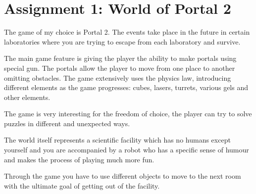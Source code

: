 \documentclass{article}
\begin{document}
\section*{Assignment 1: World of Portal 2}

The game of my choice is Portal 2. The events take place in the future in
certain laboratories where you are trying to escape from each laboratory and
survive.

The main game feature is giving the player the ability to make portals using
special gun. The portals allow the player to move from one place to another
omitting obstacles. The game extensively uses the physics law, introducing
different elements as the game progresses: cubes, lasers, turrets, various gels
and other elements.

The game is very interesting for the freedom of choice, the player can try to
solve puzzles in different and unexpected ways.

The world itself represents a scientific facility which has no humans except
yourself and you are accompanied by a robot who has a specific sense of humour
and makes the process of playing much more fun.

Through the game you have to use different objects to move to the next room with
the ultimate goal of getting out of the facility.
\end{document}
